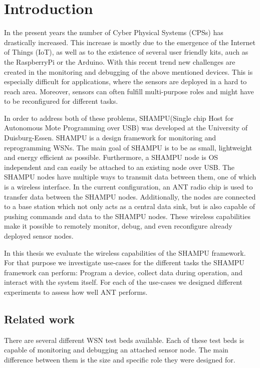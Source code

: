 \chapter{Introduction}
\label{sec:intro}
In the present years the number of Cyber Physical Systems (CPSs) has drastically increased. This increase is mostly due to the emergence of the Internet of Things (IoT), as well as to the existence of several user friendly kits, auch as the RaspberryPi or the Arduino. With this recent trend new challenges are created in the monitoring and debugging of the above mentioned devices. This is especially difficult for applications, where the sensors are deployed in a hard to reach area. Moreover, sensors can often fulfill multi-purpose roles and might have to be reconfigured for different tasks.

In order to address both of these problems, SHAMPU(Single chip Host for Autonomous Mote Programming over USB)\cite{smeets2014demonstration} was developed at the University of Duisburg-Essen. SHAMPU is a design framework for monitoring and reprogramming WSNs. The main goal of SHAMPU is to be as small, lightweight and energy efficient as possible. Furthermore, a SHAMPU node is OS independent and can easily be attached to an existing node over USB. The SHAMPU nodes have multiple ways to transmit data between them, one of which is a wireless interface. In the current configuration, an ANT\cite{DynastreamInnovationsInc.2013} radio chip is used to transfer data between the SHAMPU nodes. Additionally, the nodes are connected to a base station which not only acts as a central data sink, but is also capable of pushing commands and data to the SHAMPU nodes. These wireless capabilities make it possible to remotely monitor, debug, and even reconfigure already deployed sensor nodes. 

In this thesis we evaluate the wireless capabilities of the SHAMPU framework. For that purpose we investigate use-cases for the different tasks the SHAMPU framework can perform: Program a device, collect data during operation, and interact with the system itself. For each of the use-cases we designed different experiments to assess how well ANT performs.
\newpage


\section{Related work}
\label{sec:related_work}
There are several different WSN test beds available. Each of these test beds is capable of monitoring and debugging an attached sensor node. The main difference between them is the size and specific role they were designed for. 

